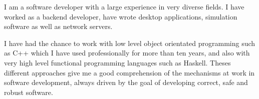 
\begin{cvparagraph}

    I am a software developer with a large experience in very diverse fields.
    I have worked as a backend developer, have wrote desktop applications,
    simulation software as well as network servers.

    I have had the chance to work with low level object orientated programming
    such as C++ which I have used professionally for more than ten years, and
    also with very high level functional programming languages such as Haskell.
    Theses different approaches give me a good comprehension of the mechanisms
    at work in software development, always driven by the goal of developing
    correct, safe and robust software.

\end{cvparagraph}

